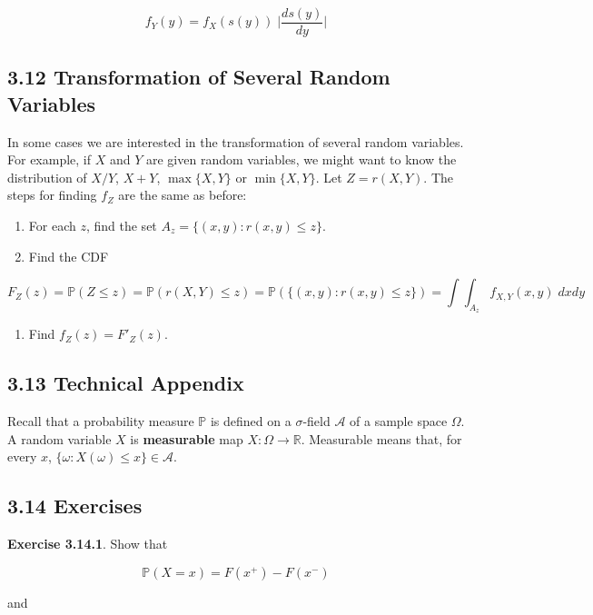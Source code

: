 \[ f_Y(y) = f_X(s(y)) \;\Bigg| \frac{ds(y)}{dy} \Bigg|\]

\subsection*{3.12 Transformation of Several Random
Variables}\label{transformation-of-several-random-variables}

In some cases we are interested in the transformation of several random
variables. For example, if \(X\) and \(Y\) are given random variables,
we might want to know the distribution of \(X / Y\), \(X + Y\),
\(\max \{ X, Y \}\) or \(\min \{ X, Y \}\). Let \(Z = r(X, Y)\). The
steps for finding \(f_Z\) are the same as before:

\begin{enumerate}[tightlist,label={\arabic*.}]
\item
  For each \(z\), find the set \(A_z = \{ (x, y) : r(x, y) \leq z \}\).
\item
  Find the CDF
\end{enumerate}

\[ F_Z(z) = \mathbb{P}(Z \leq z) = \mathbb{P}(r(X, Y) \leq z) = \mathbb{P}(\{ (x, y) : r(x, y) \leq z \})
  = \int \int_{A_z} f_{X, Y}(x, y) \; dx dy 
  \]

\begin{enumerate}[tightlist,label={\arabic*.},resume]
\item
  Find \(f_Z(z) = F'_Z(z)\).
\end{enumerate}

\subsection*{3.13 Technical Appendix}

Recall that a probability measure \(\mathbb{P}\) is defined on a
\(\sigma\)-field \(\mathcal{A}\) of a sample space \(\Omega\). A random
variable \(X\) is \textbf{measurable} map
\(X : \Omega \rightarrow \mathbb{R}\). Measurable means that, for every
\(x\), $\{ \omega : X(\omega) \leq x \} \in \mathcal{A} $.

\subsection*{3.14 Exercises}

\textbf{Exercise 3.14.1}. Show that

\[ \mathbb{P}(X = x) = F(x^+) - F(x^-) \]

and

